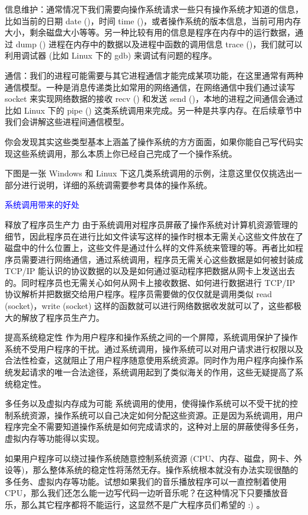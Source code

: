 \documentclass[utf8]{book}
\begin{document}
	信息维护：通常情况下我们需要向操作系统请求一些只有操作系统才知道的信息，比如当前的日期 date ()，时间 time ()，或者操作系统的版本信息，当前可用内存大小，剩余磁盘大小等等。另一种比较有用的信息是程序在内存中的运行数据，通过 dump () 进程在内存中的数据以及进程中函数的调用信息 trace ()，我们就可以利用调试器 (比如 Linux 下的 gdb) 来调试有问题的程序。
	
	通信：我们的进程可能需要与其它进程通信才能完成某项功能，在这里通常有两种通信模型。一种是消息传递类比如常用的网络通信，在网络通信中我们通过读写 socket 来实现网络数据的接收 recv () 和发送 send ()，本地的进程之间通信会通过比如 Linux 下的 pipe () 这类系统调用来完成。另一种是共享内存。在后续章节中我们会讲解这些进程间通信模型。
	
	你会发现其实这些类型基本上涵盖了操作系统的方方面面，如果你能自己写代码实现这些系统调用，那么本质上你已经自己完成了一个操作系统。
	
	下图是一张 Windows 和 Linux 下这几类系统调用的示例，注意这里仅仅挑选出一部分进行说明，详细的系统调需要参考具体的操作系统。
	
	\textcolor{blue}{系统调用带来的好处}
	
	释放了程序员生产力
	由于系统调用对程序员屏蔽了操作系统对计算机资源管理的细节，因此程序员在进行比如文件读写这样的操作时根本无需关心这些文件放在了磁盘中的什么位置上，这些文件是通过什么样的文件系统来管理的等。再者比如程序员需要进行网络通信，通过系统调用，程序员无需关心这些数据是如何被封装成 TCP/IP 能认识的协议数据的以及是如何通过驱动程序把数据从网卡上发送出去的。同时程序员也无需关心如何从网卡上接收数据、如何进行数据进行 TCP/IP 协议解析并把数据交给用户程序。程序员需要做的仅仅就是调用类似 read (socket)，write (socket) 这样的函数就可以进行网络数据收发就可以了，这些都极大的解放了程序员生产力。
	
	
	
	提高系统稳定性
	作为用户程序和操作系统之间的一个屏障，系统调用保护了操作系统不受用户程序的干扰。通过系统调用，操作系统可以对用户请求进行权限以及合法性检查，这就阻止了用户程序随意使用系统资源。同时作为用户程序向操作系统发起请求的唯一合法途径，系统调用起到了类似海关的作用，这些无疑提高了系统稳定性。
	
	
	
	多任务以及虚拟内存成为可能
	系统调用的使用，使得操作系统可以不受干扰的控制系统资源，操作系统可以自己决定如何分配这些资源。正是因为系统调用，用户程序完全不需要知道操作系统是如何完成请求的，这种对上层的屏蔽使得多任务，虚拟内存等功能得以实现。
	
	如果用户程序可以绕过操作系统随意控制系统资源 (CPU、内存、磁盘，网卡、外设等)，那么整体系统的稳定性将荡然无存。操作系统根本就没有办法实现很酷的多任务、虚拟内存等功能。试想如果我们的音乐播放程序可以一直控制着使用 CPU，那么我们还怎么能一边写代码一边听音乐呢？在这种情况下只要播放音乐，那么其它程序都将不能运行，这显然不是广大程序员们希望的 :) 。
	
\end{document}
